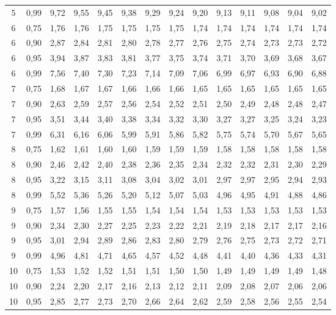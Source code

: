 \documentclass[
]{article}
\begin{document}
\begin{landscape}
\begin{longtable}[t]{cccccccccccccc}
5 & 0,99 & 9,72 & 9,55 & 9,45 & 9,38 & 9,29 & 9,24 & 9,20 & 9,13 & 9,11 & 9,08 & 9,04 & 9,02\\
6 & 0,75 & 1,76 & 1,76 & 1,75 & 1,75 & 1,75 & 1,75 & 1,74 & 1,74 & 1,74 & 1,74 & 1,74 & 1,74\\
6 & 0,90 & 2,87 & 2,84 & 2,81 & 2,80 & 2,78 & 2,77 & 2,76 & 2,75 & 2,74 & 2,73 & 2,73 & 2,72\\
6 & 0,95 & 3,94 & 3,87 & 3,83 & 3,81 & 3,77 & 3,75 & 3,74 & 3,71 & 3,70 & 3,69 & 3,68 & 3,67\\
6 & 0,99 & 7,56 & 7,40 & 7,30 & 7,23 & 7,14 & 7,09 & 7,06 & 6,99 & 6,97 & 6,93 & 6,90 & 6,88\\
7 & 0,75 & 1,68 & 1,67 & 1,67 & 1,66 & 1,66 & 1,66 & 1,65 & 1,65 & 1,65 & 1,65 & 1,65 & 1,65\\
7 & 0,90 & 2,63 & 2,59 & 2,57 & 2,56 & 2,54 & 2,52 & 2,51 & 2,50 & 2,49 & 2,48 & 2,48 & 2,47\\
7 & 0,95 & 3,51 & 3,44 & 3,40 & 3,38 & 3,34 & 3,32 & 3,30 & 3,27 & 3,27 & 3,25 & 3,24 & 3,23\\
7 & 0,99 & 6,31 & 6,16 & 6,06 & 5,99 & 5,91 & 5,86 & 5,82 & 5,75 & 5,74 & 5,70 & 5,67 & 5,65\\
8 & 0,75 & 1,62 & 1,61 & 1,60 & 1,60 & 1,59 & 1,59 & 1,59 & 1,58 & 1,58 & 1,58 & 1,58 & 1,58\\
8 & 0,90 & 2,46 & 2,42 & 2,40 & 2,38 & 2,36 & 2,35 & 2,34 & 2,32 & 2,32 & 2,31 & 2,30 & 2,29\\
8 & 0,95 & 3,22 & 3,15 & 3,11 & 3,08 & 3,04 & 3,02 & 3,01 & 2,97 & 2,97 & 2,95 & 2,94 & 2,93\\
8 & 0,99 & 5,52 & 5,36 & 5,26 & 5,20 & 5,12 & 5,07 & 5,03 & 4,96 & 4,95 & 4,91 & 4,88 & 4,86\\
9 & 0,75 & 1,57 & 1,56 & 1,55 & 1,55 & 1,54 & 1,54 & 1,54 & 1,53 & 1,53 & 1,53 & 1,53 & 1,53\\
9 & 0,90 & 2,34 & 2,30 & 2,27 & 2,25 & 2,23 & 2,22 & 2,21 & 2,19 & 2,18 & 2,17 & 2,17 & 2,16\\
9 & 0,95 & 3,01 & 2,94 & 2,89 & 2,86 & 2,83 & 2,80 & 2,79 & 2,76 & 2,75 & 2,73 & 2,72 & 2,71\\
9 & 0,99 & 4,96 & 4,81 & 4,71 & 4,65 & 4,57 & 4,52 & 4,48 & 4,41 & 4,40 & 4,36 & 4,33 & 4,31\\
10 & 0,75 & 1,53 & 1,52 & 1,52 & 1,51 & 1,51 & 1,50 & 1,50 & 1,49 & 1,49 & 1,49 & 1,49 & 1,48\\
10 & 0,90 & 2,24 & 2,20 & 2,17 & 2,16 & 2,13 & 2,12 & 2,11 & 2,09 & 2,08 & 2,07 & 2,06 & 2,06\\
10 & 0,95 & 2,85 & 2,77 & 2,73 & 2,70 & 2,66 & 2,64 & 2,62 & 2,59 & 2,58 & 2,56 & 2,55 & 2,54\\

\end{longtable}
\end{landscape}
\end{document}
